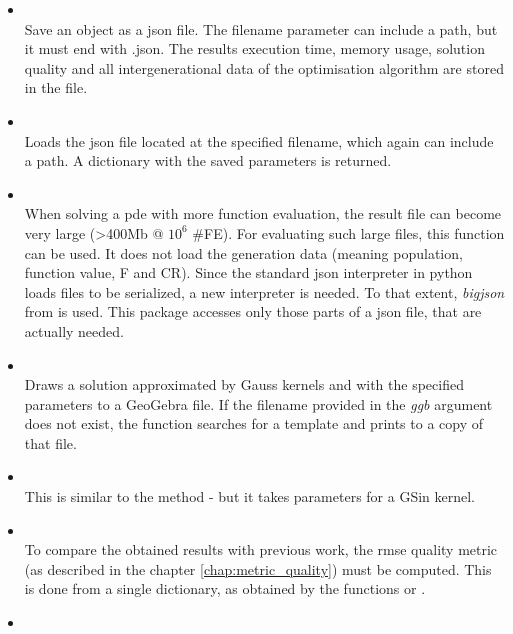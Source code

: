 \documentclass[.\jobname.tex]{subfiles}
\begin{document}
\begin{itemize}
	\item 
	 \\
	Save an  object as a \gls{json} file. The filename parameter can include a path, but it must end with .json. The results execution time, memory usage, solution quality and all intergenerational data of the optimisation algorithm are stored in the file. 
	\item {} \\
	Loads the \gls{json} file located at the specified filename, which again can include a path. A dictionary with the saved  parameters is returned. 
	\item 
	 \\
	When solving a \gls{pde} with more function evaluation, the result file can become very large (>400Mb @ $10^6$ \#FE). For evaluating such large files, this function can be used. It does not load the generation data (meaning population, function value, F and CR). Since the standard json interpreter in python loads files to be serialized, a new interpreter is needed. To that extent, \textit{bigjson} from \cite{heino_henubigjson_2020} is used. This package accesses only those parts of a json file, that are actually needed.
	\item {} \\
	Draws a solution approximated by Gauss kernels and with the specified parameters to a GeoGebra file. If the filename provided in the \textit{ggb} argument does not exist, the function searches for a template and prints to a copy of that file. 
	\item {} \\
	This is similar to the  method - but it takes parameters for a GSin kernel. 
	\item 
	 \\
	To compare the obtained results with previous work, the \gls{rmse} quality metric (as described in the chapter \ref{chap:metric_quality}) must be computed. This is done from a single dictionary, as obtained by the functions  or .
	\item 
	 \\

\end{itemize}
\end{document}
